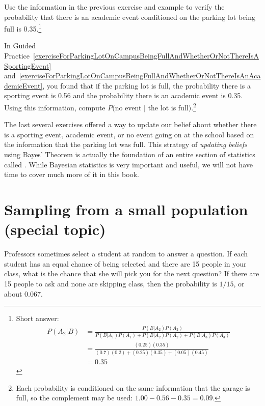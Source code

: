 \begin{exercise} \label{exerciseForParkingLotOnCampusBeingFullAndWhetherOrNotThereIsAnAcademicEvent}
Use the information in the previous exercise and example to verify the probability that there is an academic event conditioned on the parking lot being full is 0.35.\footnote{Short answer:
\begin{align*}
P(A_2 | B) &= \frac{P(B | A_2) P(A_2)}{P(B | A_1) P(A_1) + P(B | A_2) P(A_2) + P(B | A_3) P(A_3)} \\
		&= \frac{(0.25)(0.35)}{(0.7)(0.2) + (0.25)(0.35) + (0.05)(0.45)} \\
		&= 0.35
\end{align*}}
\end{exercise}

\begin{exercise} \label{exerciseForParkingLotOnCampusBeingFullAndWhetherOrNotThereIsNoEvent}
In Guided Practice~\ref{exerciseForParkingLotOnCampusBeingFullAndWhetherOrNotThereIsASportingEvent} and~\ref{exerciseForParkingLotOnCampusBeingFullAndWhetherOrNotThereIsAnAcademicEvent}, you found that if the parking lot is full, the probability there is a sporting event is 0.56 and the probability there is an academic event is 0.35. Using this information, compute $P($no event $|$ the lot is full$)$.\footnote{Each probability is conditioned on the same information that the garage is full, so the complement may be used: $1.00 - 0.56 - 0.35 = 0.09$.}
\end{exercise}

The last several exercises offered a way to update our belief about whether there is a sporting event, academic event, or no event going on at the school based on the information that the parking lot was full. This strategy of \emph{updating beliefs} using Bayes' Theorem is actually the foundation of an entire section of statistics called . While Bayesian statistics is very important and useful, we will not have time to cover much more of it in this book.




\section{Sampling from a small population (special topic)}
\label{smallPop}

\begin{example}{Professors sometimes select a student at random to answer a question. If each student has an equal chance of being selected and there are 15 people in your class, what is the chance that she will pick you for the next question?}
If there are 15 people to ask and none are skipping class, then the probability is $1/15$, or about $0.067$.
\end{example}

